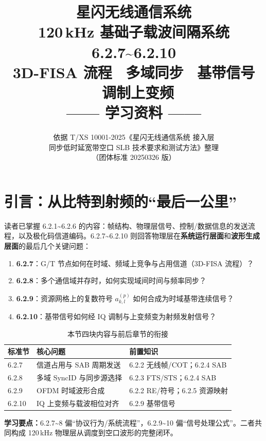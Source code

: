 \documentclass[11pt,a4paper]{ctexart}
\title{%
  \textbf{星闪无线通信系统}\\[0.5em]
  \Large 120\,kHz 基础子载波间隔系统\\[0.3em]
  6.2.7\textasciitilde 6.2.10\\[0.2em]
  \normalsize 3D-FISA 流程 \textbullet\ 多域同步 \textbullet\ 基带信号 \textbullet\ 调制上变频\\[0.5em]
  \large —— 学习资料 ——
}
\author{依据 T/XS 10001-2025《星闪无线通信系统 接入层\\
同步低时延宽带空口 SLB 技术要求和测试方法》整理\\
（团体标准 20250326 版）}
\date{}
\newcommand{\learn}[1]{\par\noindent\textcolor{blue!70!black}{\textbf{学习要点：}#1}\par}
\begin{document}
\maketitle
\tableofcontents
\newpage

\section{引言：从比特到射频的“最后一公里”}

读者已掌握 6.2.1\textasciitilde 6.2.6 的内容：帧结构、物理层信号、控制/数据信息的发送流程，以及极化码信道编码。6.2.7\textasciitilde 6.2.10 则回答物理层在\textbf{系统运行层面}和\textbf{波形生成层面}的最后几个关键问题：

\begin{enumerate}
  \item \textbf{6.2.7}：G/T 节点如何在时域、频域上竞争与占用信道（3D-FISA 流程）？
  \item \textbf{6.2.8}：多个通信域并存时，如何实现域间时间与频率同步？
  \item \textbf{6.2.9}：资源网格上的复数符号 $a_{k,l}^{(p)}$ 如何合成为时域基带连续信号？
  \item \textbf{6.2.10}：基带信号如何经 IQ 调制与上变频变为射频发射信号？
\end{enumerate}

\begin{table}[h]
\centering
\caption{本节四块内容与前后章节的衔接}
\begin{tabular}{lll}
\toprule
\textbf{标准节} & \textbf{核心问题} & \textbf{前置知识} \\
\midrule
6.2.7 & 信道占用与 SAB 周期发送 & 6.2.2 无线帧/COT；6.2.4 SAB \\
6.2.8 & 多域 SyncID 与同步源选择 & 6.2.3 FTS/STS；6.2.4 SAB \\
6.2.9 & OFDM 时域波形合成 & 6.2.2 RE/符号；6.2.5 资源映射 \\
6.2.10 & IQ 上变频与载波相位对齐 & 6.2.9 基带信号 \\
\bottomrule
\end{tabular}
\end{table}

\learn{6.2.7\textasciitilde 8 偏“协议行为/系统流程”，6.2.9\textasciitilde 10 偏“信号处理公式”。二者共同构成 120\,kHz 物理层从调度到空口波形的完整闭环。}

\newpage
\end{document}
